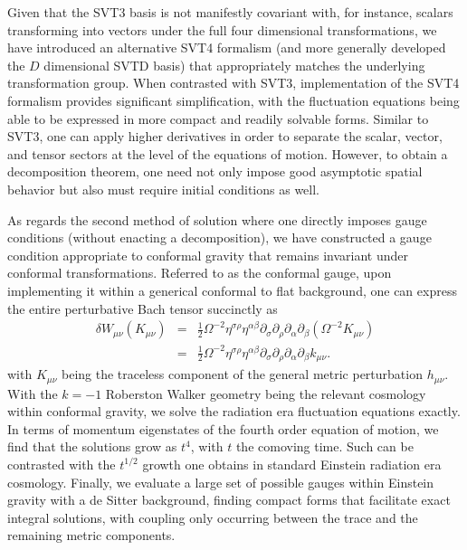 Given that the SVT3 basis is not manifestly covariant with, for instance, scalars transforming into vectors under the full four dimensional transformations, we have introduced an alternative SVT4 formalism (and more generally developed the $D$ dimensional SVTD basis) that appropriately matches the underlying transformation group. When contrasted with SVT3, implementation of the SVT4 formalism provides significant simplification, with the fluctuation equations being able to be expressed in more compact and readily solvable forms. Similar to SVT3, one can apply higher derivatives in order to separate the scalar, vector, and tensor sectors at the level of the equations of motion. However, to obtain a decomposition theorem, one need not only impose good asymptotic spatial behavior but also must require initial conditions as well. 

As regards the second method of solution where one directly imposes gauge conditions (without enacting a decomposition), we have constructed a gauge condition appropriate to conformal gravity that remains invariant under conformal transformations. Referred to as the conformal gauge, upon implementing it within a generical conformal to flat background, one can express the entire perturbative Bach tensor succinctly as
%
\begin{eqnarray}
\delta W_{\mu\nu}(K_{\mu\nu})&=&\frac{1}{2}\Omega^{-2}\eta^{\sigma\rho}\eta^{\alpha\beta}\partial_{\sigma}\partial_{\rho} \partial_{\alpha}\partial_{\beta}(\Omega^{-2}K_{\mu\nu})
\nonumber\\
&=&\frac{1}{2}\Omega^{-2}\eta^{\sigma\rho}\eta^{\alpha\beta}\partial_{\sigma}\partial_{\rho} \partial_{\alpha}\partial_{\beta}k_{\mu\nu}.
\nonumber
\end{eqnarray}
%
with $K_{\mu\nu}$ being the traceless component of the general metric perturbation $h_{\mu\nu}$. With the $k=-1$ Roberston Walker geometry being the relevant cosmology within conformal gravity, we solve the radiation era fluctuation equations exactly. In terms of momentum eigenstates of the fourth order equation of motion, we find that the solutions grow as $t^4$, with $t$ the comoving time. Such can be contrasted with the $t^{1/2}$ growth one obtains in standard Einstein radiation era cosmology. Finally, we evaluate a large set of possible gauges within Einstein gravity with a de Sitter background, finding compact forms that facilitate exact integral solutions, with coupling only occurring between the trace and the remaining metric components. 